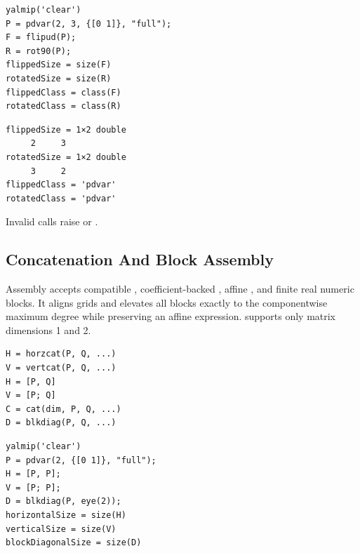 \examplehead
\begin{lstlisting}[style=dpmatlab]
yalmip('clear')
P = pdvar(2, 3, {[0 1]}, "full");
F = flipud(P);
R = rot90(P);
flippedSize = size(F)
rotatedSize = size(R)
flippedClass = class(F)
rotatedClass = class(R)
\end{lstlisting}

\begin{lstlisting}[style=dpoutput]
flippedSize = 1×2 double
     2     3
rotatedSize = 1×2 double
     3     2
flippedClass = 'pdvar'
rotatedClass = 'pdvar'
\end{lstlisting}

\begin{center}
\end{center}

Invalid calls raise  or .

\subsection{Concatenation And Block Assembly}
\label{sec:pdvar-matrix-assembly}

Assembly accepts compatible , coefficient-backed , affine , and finite real numeric blocks. It aligns grids and elevates all blocks exactly to the componentwise maximum degree while preserving an affine expression.  supports only matrix dimensions 1 and 2.

\syntaxhead
\begin{lstlisting}[style=dpsyntax]
H = horzcat(P, Q, ...)
V = vertcat(P, Q, ...)
H = [P, Q]
V = [P; Q]
C = cat(dim, P, Q, ...)
D = blkdiag(P, Q, ...)
\end{lstlisting}

\examplehead
\begin{lstlisting}[style=dpmatlab]
yalmip('clear')
P = pdvar(2, {[0 1]}, "full");
H = [P, P];
V = [P; P];
D = blkdiag(P, eye(2));
horizontalSize = size(H)
verticalSize = size(V)
blockDiagonalSize = size(D)
\end{lstlisting}

